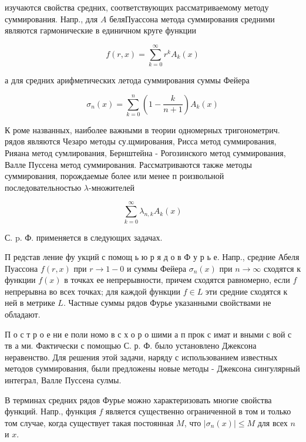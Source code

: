 \documentclass[10pt]{article}
\begin{document}
изучаются свойства средних, соответствующих рассматриваемому методу суммирования. Напр., для $A$ беляПуассона метода суммирования средними являются гармонические в единичном круге функции



\[

f(r, x)=\sum_{k=0}^{\infty} r^{k} A_{k}(x)

\]



а для средних арифметических летода суммирования суммы Фейера



\[

\sigma_{n}(x)=\sum_{k=0}^{n}\left(1-\frac{k}{n+1}\right) A_{k}(x)

\]



К роме названных, наиболее важными в теории одномерных тригонометрич. рядов являются Чезаро методы су.щмирования, Рисса метод суммирования, Рияана метод сумлирования, Бернштейна - Рогозинского метод суммирования, Валле Пуссена метод суммирования. Рассматриваются также методы суммирования, порождаемые более или менее п роизвольной последовательностью $\lambda$-множителей



\[

\sum_{k=0}^{\infty} \lambda_{n, k} A_{k}(x)

\]



С. p. Ф. применяется в следующих задачах.



П редстав ление фу укций с помощ ь ю р я д о в Ф у р ь е. Напр., средние Абеля Пуассона $f(r, x)$ при $r \rightarrow 1-0$ и суммы Фейера $\sigma_{n}(x)$ при $n \rightarrow \infty$ сходятся к функции $f(x)$ в точках ее непрерывности, причем сходятся равномерно, если $f$ непрерывна во всех точках; для каждой функции $f \in L$ эти средние сходятся к ней в метрике $L$. Частные суммы рядов Фурье указанными свойствами не обладают.



П о с т р о е ни е поли номо в с х о р о шими а п прок с имат и вными с вой с тв а ми. Фактически с помощью С. р. Ф. было установлено Джексона неравенство. Для решения этой задачи, наряду с использованием известных методов суммирования, были предложены новые методы - Джексона сингулярный интеграл, Валле Пуссена сулмы.



В терминах средних рядов Фурье можно характеризовать многие свойства функций. Напр., функция $f$ является существенно ограниченной в том и только том случае, когда существует такая постоянная $M$, что $\left|\sigma_{n}(x)\right| \leqslant M$ для всех $n$ и $x$.
\end{document}
